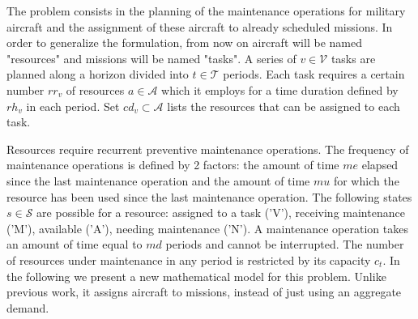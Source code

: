 \documentclass{roadef}
\begin{document}

    The problem consists in the planning of the maintenance operations for military aircraft and the assignment of these aircraft to already scheduled missions. In order to generalize the formulation, from now on aircraft will be named "resources" and missions will be named "tasks". A series of $v \in \mathcal{V}$ tasks are planned along a horizon divided into $t \in \mathcal{T}$ periods. Each task requires a certain number $rr_{v}$ of resources $a \in \mathcal{A}$ which it employs for a time duration defined by $rh_{v}$ in each period. Set $cd_{v} \subset \mathcal{A}$ lists the resources that can be assigned to each task.



    Resources require recurrent preventive maintenance operations. The frequency of maintenance operations is defined by 2 factors: the amount of time $me$ elapsed since the last maintenance operation and the amount of time $mu$ for which the resource has been used since the last maintenance operation. The following states $s \in \mathcal{S}$ are possible for a resource: assigned to a task ('V'), receiving maintenance ('M'), available ('A'), needing maintenance ('N'). A maintenance operation takes an amount of time equal to $md$ periods and cannot be interrupted. The number of resources under maintenance in any period is restricted by its capacity $c_t$. In the following we present a new mathematical model for this problem. Unlike previous work, it assigns aircraft to missions, instead of just using an aggregate demand. 
\end{document}
